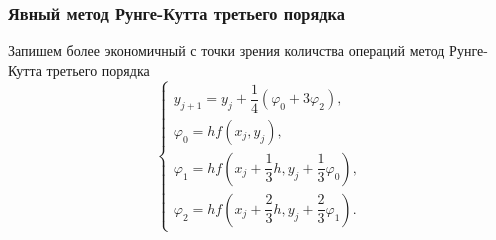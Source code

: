 \documentclass[11pt]{article}
\begin{document}
    \subsubsection*{Явный метод Рунге-Кутта третьего
порядка}\label{ux44fux432ux43dux44bux439-ux43cux435ux442ux43eux434-ux440ux443ux43dux433ux435-ux43aux443ux442ux442ux430-ux442ux440ux435ux442ux44cux435ux433ux43e-ux43fux43eux440ux44fux434ux43aux430}

    Запишем более экономичный с точки зрения количства операций метод
Рунге-Кутта третьего порядка \[\begin{cases}
                y_{j+1} = y_j + \dfrac14 (\varphi_0 + 3\varphi_2),\\
                \varphi_0 = hf(x_j, y_j),\\
                \varphi_1 = hf\left(x_j + \dfrac13h, y_j + \dfrac13 \varphi_0\right),\\
                \varphi_2 = hf\left(x_j + \dfrac23h, y_j + \dfrac23\varphi_1\right).
            \end{cases}\]
\end{document}
